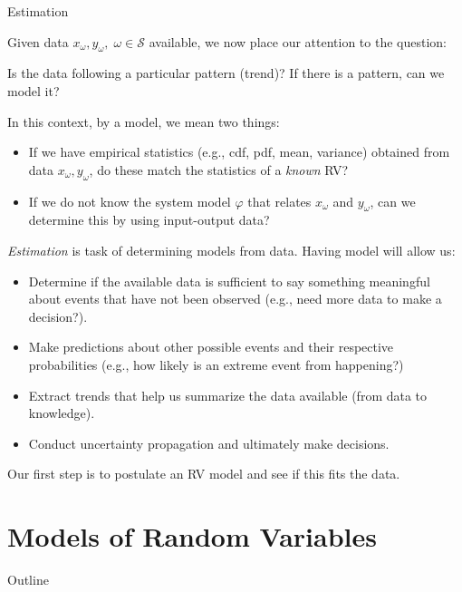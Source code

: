 \documentclass[9pt]{beamer}
\begin{document}
%
\begin{frame}{Estimation}

Given data $x_\omega, y_\omega,\; \omega \in \mathcal{S}$ available, we now place our attention to the question:
\begin{block}{}
Is the data following a particular pattern (trend)? If there is a pattern, can we model it? 
\end{block}
In this context, by a model, we mean two things: 
\begin{itemize}
\item If we have empirical statistics (e.g., cdf, pdf, mean, variance) obtained from data $x_\omega,y_\omega$, do these match the statistics of a {\em known} RV?
\item If we do not know the system model $\varphi$ that relates $x_\omega$ and $y_\omega$, can we determine this by using input-output data? 
\end{itemize}
{\em Estimation} is task of determining models from data.  Having model will allow us:
\begin{block}{}
\begin{itemize}
\item Determine if the available data is sufficient to say something meaningful about events that have not been observed (e.g., need more data to make a decision?). 
\item Make predictions about other possible events and their respective probabilities (e.g., how likely is an extreme event from happening?)
\item Extract trends that help us summarize the data available (from data to knowledge). 
\item Conduct uncertainty propagation and ultimately make decisions. 
\end{itemize}
\end{block}
Our first step is to postulate an RV model and see if this fits the data. 
\end{frame}

\section{Models of Random Variables}
\begin{frame}{Outline}
\tableofcontents[currentsection]
\end{frame}
\end{document}
